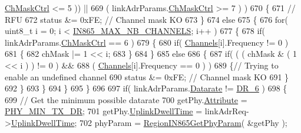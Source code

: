 \begin{DoxyCode}
      \mbox{\hyperlink{structs_region_common_link_adr_params_ac5e1891f30a172b2ce39bc3498e1843d}{ChMaskCtrl}} <= 5 )) ||
669                 ( linkAdrParams.\mbox{\hyperlink{structs_region_common_link_adr_params_ac5e1891f30a172b2ce39bc3498e1843d}{ChMaskCtrl}} >= 7 ) )
670         \{
671             \textcolor{comment}{// RFU}
672             status &= 0xFE; \textcolor{comment}{// Channel mask KO}
673         \}
674         \textcolor{keywordflow}{else}
675         \{
676             \textcolor{keywordflow}{for}( uint8\_t i = 0; i < \mbox{\hyperlink{group___r_e_g_i_o_n_i_n865_ga6fbcf463cb8df05984d576d96383651d}{IN865\_MAX\_NB\_CHANNELS}}; i++ )
677             \{
678                 \textcolor{keywordflow}{if}( linkAdrParams.\mbox{\hyperlink{structs_region_common_link_adr_params_ac5e1891f30a172b2ce39bc3498e1843d}{ChMaskCtrl}} == 6 )
679                 \{
680                     \textcolor{keywordflow}{if}( \mbox{\hyperlink{_region_i_n865_8c_adad6dcb99199b5142166021a8aac9aa2}{Channels}}[i].Frequency != 0 )
681                     \{
682                         chMask |= 1 << i;
683                     \}
684                 \}
685                 \textcolor{keywordflow}{else}
686                 \{
687                     \textcolor{keywordflow}{if}( ( ( chMask & ( 1 << i ) ) != 0 ) &&
688                         ( \mbox{\hyperlink{_region_i_n865_8c_adad6dcb99199b5142166021a8aac9aa2}{Channels}}[i].Frequency == 0 ) )
689                     \{\textcolor{comment}{// Trying to enable an undefined channel}
690                         status &= 0xFE; \textcolor{comment}{// Channel mask KO}
691                     \}
692                 \}
693             \}
694         \}
695     \}
696 
697     \textcolor{keywordflow}{if}( linkAdrParams.\mbox{\hyperlink{structs_region_common_link_adr_params_ae2f6080f3aa0e9485c55513ca56bb24d}{Datarate}} != \mbox{\hyperlink{group___r_e_g_i_o_n_ga8e2b4c15b7dbb8bda5ed635ca1d262be}{DR\_6}} )
698     \{
699         \textcolor{comment}{// Get the minimum possible datarate}
700         getPhy.\mbox{\hyperlink{structs_get_phy_params_abdcb168ffd6913b85e2f635d7a475f2d}{Attribute}} = \mbox{\hyperlink{group___r_e_g_i_o_n_gga51cbe8f5433d914fe9cf81b451de2c2daace3e56c88b40def8ed6a9106871e7de}{PHY\_MIN\_TX\_DR}};
701         getPhy.\mbox{\hyperlink{structs_get_phy_params_a0e6663762d6f9173bc8d8cb018f8f17a}{UplinkDwellTime}} = linkAdrReq->\mbox{\hyperlink{structs_link_adr_req_params_a0e6663762d6f9173bc8d8cb018f8f17a}{UplinkDwellTime}};
702         phyParam = \mbox{\hyperlink{group___r_e_g_i_o_n_i_n865_ga209a89a7195dbbee8428bbcd0133d986}{RegionIN865GetPhyParam}}( &getPhy );

\end{DoxyCode}

